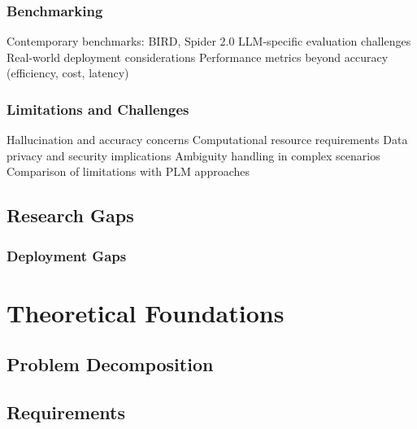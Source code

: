 \documentclass{article}
\begin{document}
\subsubsection{Benchmarking}

Contemporary benchmarks: BIRD, Spider 2.0 \citep{BIRD, SPIDER2}
LLM-specific evaluation challenges \citep{LLM-SQL}
Real-world deployment considerations \citep{NL2SQLUnsolved}
Performance metrics beyond accuracy (efficiency, cost, latency)


\subsubsection{Limitations and Challenges}
Hallucination and accuracy concerns
Computational resource requirements
Data privacy and security implications
Ambiguity handling in complex scenarios
Comparison of limitations with PLM approaches




% 


\subsection{Research Gaps}

\subsubsection{Deployment Gaps}

\newpage

\section{Theoretical Foundations}

\subsection{Problem Decomposition}

\subsection{Requirements}
\end{document}
